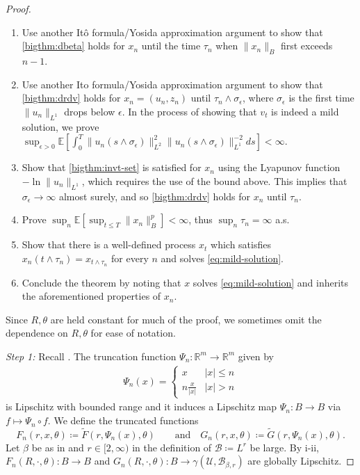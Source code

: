 \documentclass[final]{amsart}
\numberwithin{thm}{section}
\numberwithin{equation}{section}
\newcommand{\E}{\mathbb{E}}
\newcommand{\U}{\mathcal{U}}
\newcommand{\R}{\mathbb{R}}
\newcommand{\B}{\mathcal{B}}
\begin{document}
\begin{proof}
\begin{enumerate}
    \item Use another It\^{o} formula/Yosida approximation argument to show that \ref{bigthm:dbeta} holds for $x_n$ until the time $\tau_n$ when $\|x_n\|_B$ first exceeds $n-1$.
    \item Use another Ito formula/Yosida approximation argument to show that \ref{bigthm:drdv} holds for $x_n = (u_n,z_n)$ until $\tau_n \wedge \sigma_\epsilon$, where $\sigma_\epsilon$ is the first time $\|u_n\|_{L^1}$ drops below $\epsilon$. In the process of showing that $v_t$ is indeed a mild solution, we prove $\sup_{\epsilon > 0}\E[\int_0^T \|u_n(s \wedge \sigma_\epsilon)\|_{L^2}^2\|u_n(s \wedge \sigma_\epsilon)\|_{L^1}^{-2}ds] < \infty$.
    \item Show that \ref{bigthm:invt-set} is satisfied for $x_n$ using the Lyapunov function $-\ln{\|u_n\|_{L^1}}$, which requires the use of the bound above. This implies that $\sigma_\epsilon \to \infty$ almost surely, and so \ref{bigthm:drdv} holds for $x_n$ until $\tau_n$.
    \item Prove $\sup_n \E[\sup_{t \leq T} \|x_n\|_B^p] < \infty$, thus $\sup_n \tau_n = \infty$ a.s.
    \item Show that there is a well-defined process $x_t$ which satisfies $x_n(t \wedge \tau_n) = x_{t \wedge \tau_n}$ for every $n$ and solves \eqref{eq:mild-solution}.
    \item Conclude the theorem by noting that $x$ solves \eqref{eq:mild-solution} and inherits the aforementioned properties of $x_n$.
    
\end{enumerate}

Since $R,\theta$ are held constant for much of the proof, we sometimes omit the dependence on $R,\theta$ for ease of notation.

\textit{Step 1:} Recall . The truncation function $\Psi_n: \R^m \to \R^m$ given by
\begin{equation}\label{eq:trunc-psi-map}
          \begin{aligned}
        \Psi_n(x) = \begin{cases}
             x  & |x| \leq n \\
            n\frac{x}{|x|} & |x| > n
        \end{cases}
    \end{aligned}
\end{equation}
is Lipschitz with bounded range and it induces a Lipschitz map $\Psi_n: B \to B$ via
$f \mapsto \Psi_n \circ f$. We define the truncated functions 
\begin{equation}\label{eq:dffngn}
F_n(r,x,\theta) \coloneqq \tilde F(r, \Psi_n(x),\theta) \qquad 
\textrm{and} \quad G_n(r,x,\theta) \coloneqq \tilde G(r,\Psi_n(x),
\theta).    
\end{equation}
 Let $\beta$ be as in  and $r \in [2,\infty)$ in the definition of $\B \coloneqq L^r$ be large. By  i-ii, $F_n(R,\cdot,\theta):B \to B$ and $G_n(R,\cdot,\theta): B \to \gamma(\U,\B_{\beta,r})$ are globally Lipschitz.
    

\end{proof}
\end{document}
